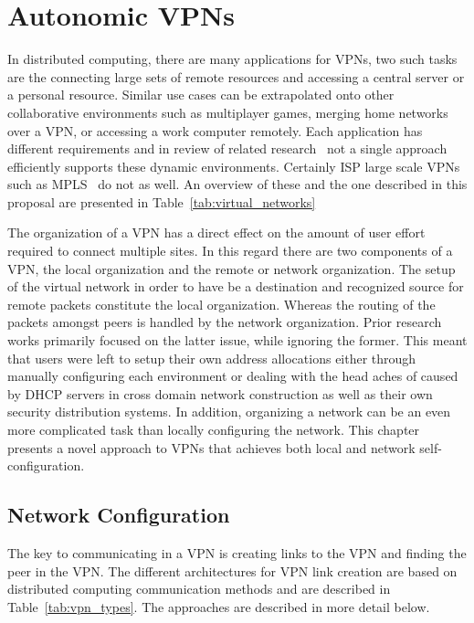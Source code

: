 \chapter{Autonomic VPNs}
\label{vpns}
In distributed computing, there are many applications for VPNs, two such tasks
are the connecting large sets of remote resources and accessing a central
server or a personal resource.  Similar use cases can be extrapolated onto
other collaborative environments such as multiplayer games, merging home
networks over a VPN, or accessing a work computer remotely.  Each application
has different requirements and in review of related research~\cite{ipop, vine,
violin, vnet, ocala, softudc, openvpn, hamachi, wippien, gbridge, pvc, tinc,
n2n, p2pvpn, l2tp} not a single approach efficiently supports these dynamic
environments.  Certainly ISP large scale VPNs such as MPLS~\cite{mpls} do not
as well.  An overview of these and the one described in this proposal are
presented in Table~\ref{tab:virtual_networks}

The organization of a VPN has a direct effect on the amount of user effort
required to connect multiple sites.  In this regard there are two components of
a VPN, the local organization and the remote or network organization.  The setup
of the virtual network in order to have be a destination and recognized source
for remote packets constitute the local organization.  Whereas the routing of
the packets amongst peers is handled by the network organization.  Prior
research works primarily focused on the latter issue, while ignoring the former.
This meant that users were left to setup their own address allocations either
through manually configuring each environment or dealing with the head aches of
caused by DHCP servers in cross domain network construction as well as their
own security distribution systems.  In addition, organizing a network can be an
even more complicated task than locally configuring the network.  This chapter
presents a novel approach to VPNs that achieves both local and network
self-configuration.

\section{Network Configuration}
The key to communicating in a VPN is creating links to the VPN and finding
the peer in the VPN.  The different architectures for VPN link creation are
based on distributed computing communication methods and are described in
Table~\ref{tab:vpn_types}.  The approaches are described in more detail
below.

